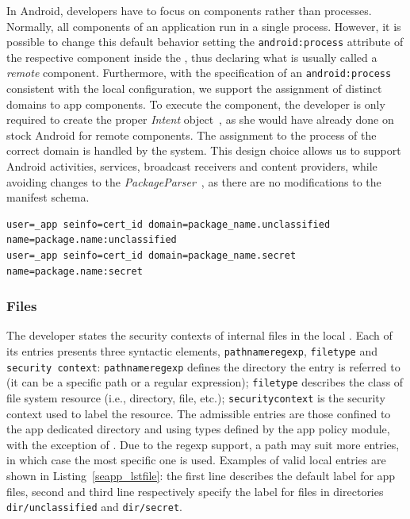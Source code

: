 In Android, developers have to focus on components rather than
processes.  Normally, all components of an application run in a single
process.  However, it is possible to change this default behavior
setting the \texttt{android:process} attribute of the respective
component inside the \manifest, thus declaring what is usually called
a {\em remote} component.  Furthermore, with the specification of an
\texttt{android:process} consistent with the local \seappcontexts
configuration, we support the assignment of distinct domains to app
components.  To execute the component, the developer is only required
to create the proper \emph{Intent} object~\cite{seapp_intentsstart},
as she would have already done on stock Android for remote components.
The assignment to the process of the correct domain is handled by the
system.  This design choice allows us to support Android activities,
services, broadcast receivers and content providers, while avoiding
changes to the \textit{PackageParser}~\cite{seapp_packparse}, as there
are no modifications to the manifest schema.

\begin{lstlisting}[language=policyfile, caption=\seappcontexts
  example, label=seapp_lstseapp, numbersep=2pt,resetmargins=false,
  breakatwhitespace=true,postbreak=\mbox{{$\hookrightarrow$}\space},
  breakindent=1ex]
user=_app seinfo=cert_id domain=package_name.unclassified name=package.name:unclassified
user=_app seinfo=cert_id domain=package_name.secret name=package.name:secret
\end{lstlisting}

\subsubsection{Files}\label{subsub:seapp_files_control}

The developer states the \sel security contexts of internal files in
the local \filecontexts.  Each of its entries presents three syntactic
elements, \texttt{pathname\textunderscore regexp},
\texttt{file\textunderscore type} and \texttt{security\textunderscore
  context}: \texttt{pathname\textunderscore regexp}
defines the directory the entry is referred to (it can be a specific
path or a regular expression); \texttt{file\textunderscore type}
describes the class of file system resource (i.e., directory, file,
etc.); \texttt{security\textunderscore context} is the security
context used to label the resource.  The admissible entries are those
confined to the app dedicated directory and using types defined by the
app policy module, with the exception of \appdatafile.  Due to the
regexp support, a path may suit more entries, in which case the most
specific one is used.  Examples of valid local \filecontexts entries
are shown in Listing~\ref{seapp_lstfile}: the first line describes the
default label for app files, second and third line respectively
specify the label for files in directories {\tt dir/unclassified} and
{\tt dir/secret}.

